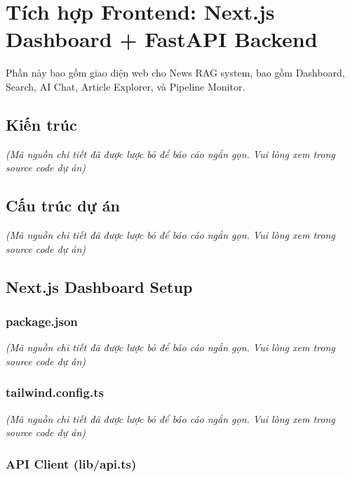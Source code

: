 \hypertarget{tuxedch-hux1ee3p-frontend-next.js-dashboard-fastapi-backend}{%
\section{Tích hợp Frontend: Next.js Dashboard + FastAPI
Backend}}

Phần này bao gồm giao diện web cho News RAG system, bao gồm Dashboard,
Search, AI Chat, Article Explorer, và Pipeline Monitor.

\hypertarget{kiux1ebfn-truxfac}{%
\subsection{Kiến trúc}}

\emph{(Mã nguồn chi tiết đã được lược bỏ để báo cáo ngắn gọn. Vui lòng
xem trong source code dự án)}

\hypertarget{cux1ea5u-truxfac-dux1ef1-uxe1n}{%
\subsection{Cấu trúc dự án}}

\emph{(Mã nguồn chi tiết đã được lược bỏ để báo cáo ngắn gọn. Vui lòng
xem trong source code dự án)}

\hypertarget{next.js-dashboard-setup}{%
\subsection{Next.js Dashboard Setup}}

\hypertarget{package.json}{%
\subsubsection{package.json}}

\emph{(Mã nguồn chi tiết đã được lược bỏ để báo cáo ngắn gọn. Vui lòng
xem trong source code dự án)}

\hypertarget{tailwind.config.ts}{%
\subsubsection{tailwind.config.ts}}

\emph{(Mã nguồn chi tiết đã được lược bỏ để báo cáo ngắn gọn. Vui lòng
xem trong source code dự án)}

\hypertarget{api-client-libapi.ts}{%
\subsubsection{API Client (lib/api.ts)}}

